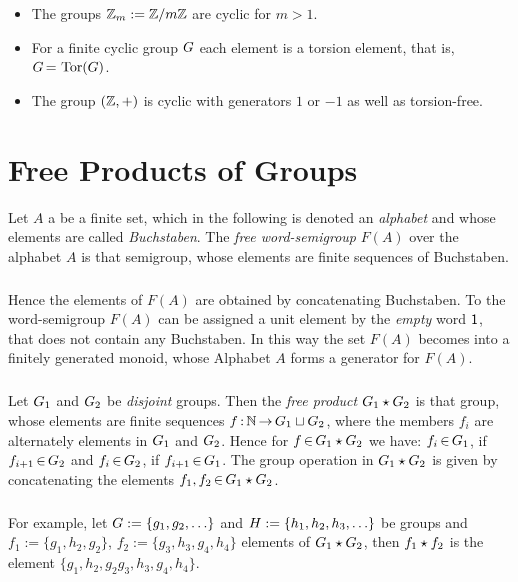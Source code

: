 \documentclass[11pt,twoside]{article}
\begin{document}
\begin{itemize}[leftmargin=15pt]
\item[1.]
The groups ${\mathbb{Z}}_m := {\mathbb{Z}} / m{\mathbb{Z}}$ are cyclic for $m > 1$.
\item[2.]
For a finite cyclic group $G$ each element
is a torsion element,
that is,
$G {\,=\,} \operatorname{Tor}(G)$.
\item[3.]
The group $({\mathbb{Z}},+)$ is cyclic with generators $1$ or $-1$
as well as torsion-free.
\end{itemize}

\section{Free Products of Groups}
Let $A$ a be a finite set,
which in the following is denoted an \textit{alphabet} and whose elements
are called \textit{Buchstaben}.
The \textit{free word-semigroup} $F(A)$ over the alphabet $A$
is that semigroup,
whose elements are finite sequences of Buchstaben.

\subparagraph{}
Hence the elements of $F(A)$ are obtained by concatenating Buchstaben.
To the word-semigroup $F(A)$ can be assigned a unit element by
the \textit{empty} word ${\mathsf{1}}$,
that does not contain any Buchstaben.
In this way the set $F(A)$ becomes into a finitely generated monoid,
whose Alphabet $A$ forms a generator for $F(A)$.

\subparagraph{}
Let $G_1$ and $G_2$ be \textit{disjoint} groups.
Then the \textit{free product} $G_1 \star G_2$ is that group,
whose elements are finite sequences $f{\,:\,}{\mathbb{N}} {\,\to\,} G_1 \sqcup G_2$,
where the members $f_i$ are alternately elements in $G_1$ and $G_2$.
Hence for $f {\,\in\,} G_1 \star G_2$ we have:
$f_i {\,\in\,} G_1$,
if $f_{i+1} {\,\in\,} G_2$ and
$f_i {\,\in\,} G_2$,
if $f_{i+1} {\,\in\,} G_1$.
The group operation in $G_1 \star G_2$ is given
by concatenating the elements $f_1,f_2 {\,\in\,} G_1 \star G_2$.

\subparagraph{}
For example,
let $G := \{g_1,g_2,     \ldots\}$ and
     $H := \{h_1,h_2,h_3,\ldots\}$ be groups and
$f_1 := \{g_1,h_2,g_2\}$, $f_2 := \{g_3,h_3,g_4,h_4\}$
elements of $G_1 \star G_2$,
then $f_1 \star f_2$ is the element $\{g_1,h_2,g_2 g_3,h_3,g_4,h_4\}$.
\end{document}
